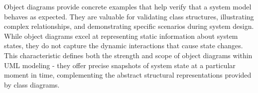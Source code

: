 Object diagrams provide concrete examples that help verify that a system model behaves as expected. They are valuable for validating class structures, illustrating complex relationships, and demonstrating specific scenarios during system design. While object diagrams excel at representing static information about system states, they do not capture the dynamic interactions that cause state changes. This characteristic defines both the strength and scope of object diagrams within UML modeling - they offer precise snapshots of system state at a particular moment in time, complementing the abstract structural representations provided by class diagrams.

